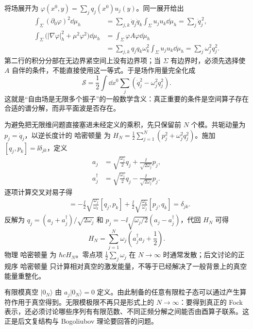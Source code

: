 将场展开为 $\varphi(x^0,y)=\sum_jq_j(x^0)u_j(y)$。同一展开给出
\begin{align*}
 \int_\Sigma(\partial_0\varphi)^2\dd\mu_h
 &=\sum_{j,k}\dot q_j\dot q_k\int_\Sigma u_ju_k\dd\mu_h
 =\sum_j\dot q_j^{\,2},\\
 \int_\Sigma\bigl(|\nabla\varphi|_h^2+\mu^2\varphi^2\bigr)\dd\mu_h
 &=\int_\Sigma\varphi A\varphi\dd\mu_h\\
 &=\sum_{j,k}q_jq_k\omega_k^2\int_\Sigma u_ju_k\dd\mu_h
 =\sum_j\omega_j^2q_j^2.
\end{align*}
第二行的积分分部在无边界紧空间上没有边界项；当 $\Sigma$ 有边界时，必须先选择使 $A$ 自伴的条件，不能直接使用这一等式。于是场作用量完全化成
\begin{equation}\label{eq:ghs-bridge-oscillator-action}
 \mathscr S=\frac12\int\dd x^0\sum_j(\dot q_j^2-\omega_j^2q_j^2).
\end{equation}
这就是“自由场是无限多个振子”的一般数学含义：真正重要的条件是空间算子存在合适的谱分解，而非平面波是否存在。



为避免把无限维问题直接塞进未经定义的乘积，先只保留前 $N$ 个模。共轭动量为 $p_j=\dot q_j$，以逆长度计的 哈密顿量 为 $H_N=\frac12\sum_{j=1}^{N}(p_j^2+\omega_j^2q_j^2)$。施加 $[q_j,p_k]=\ii\delta_{jk}$，定义
\begin{align*}
 a_j&=\sqrt{\frac{\omega_j}{2}}q_j+\frac{\ii}{\sqrt{2\omega_j}}p_j,\\
 a_j^\dagger&=\sqrt{\frac{\omega_j}{2}}q_j-\frac{\ii}{\sqrt{2\omega_j}}p_j.
\end{align*}
逐项计算交叉对易子得
\begin{align*}
 [a_j,a_k^\dagger]
 &=-\frac{\ii}{2}\sqrt{\frac{\omega_j}{\omega_k}}[q_j,p_k]
 +\frac{\ii}{2}\sqrt{\frac{\omega_k}{\omega_j}}[p_j,q_k]
 =\delta_{jk}.
\end{align*}
反解为 $q_j=(a_j+a_j^\dagger)/\sqrt{2\omega_j}$ 和
$p_j=-\ii\sqrt{\omega_j/2}(a_j-a_j^\dagger)$，代回 $H_N$ 可得
\[
 H_N=\sum_{j=1}^{N}\omega_j\left(a_j^\dagger a_j+\frac12\right).
\]
物理 哈密顿量 为 $\hbar cH_N$。零点项 $\frac12\sum_j\omega_j$ 在 $N\to\infty$ 时通常发散；后文讨论的正规序 哈密顿量 只计算相对真空的激发能量，不等于已经解决了一般背景上的真空能量重整化。



有限模真空 $|0_N\rangle$ 由 $a_j|0_N\rangle=0$ 定义。由此制备的任意有限粒子态可以通过产生算符作用于真空得到。无限模极限不再只是形式上的 $N\to\infty$：要得到真正的 Fock 表示，还必须讨论哪些序列有有限范数、不同正频分解之间能否由酉算子联系。这正是后文复结构与 Bogoliubov 理论要回答的问题。


